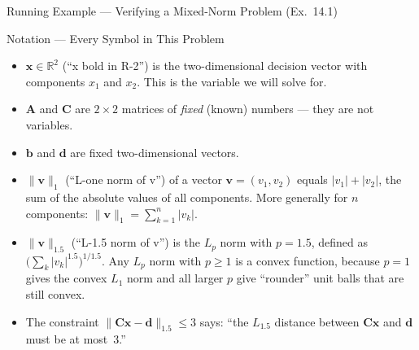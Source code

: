\documentclass[aspectratio=169,10pt]{beamer}
\begin{document}
\begin{frame}[allowframebreaks]{Running Example --- Verifying a Mixed-Norm Problem (Ex.\ 14.1)}
  \begin{block}{Notation --- Every Symbol in This Problem}
    \begin{itemize}
      \item $\mathbf{x} \in \mathbb{R}^2$ (``x bold in R-2'') is the
            two-dimensional decision vector with components $x_1$ and
            $x_2$.  This is the variable we will solve for.
      \item $\mathbf{A}$ and $\mathbf{C}$ are $2 \times 2$ matrices of
            \emph{fixed} (known) numbers --- they are not variables.
      \item $\mathbf{b}$ and $\mathbf{d}$ are fixed two-dimensional
            vectors.
      \item $\|\mathbf{v}\|_1$ (``L-one norm of v'') of a vector
            $\mathbf{v} = (v_1, v_2)$ equals $|v_1| + |v_2|$, the sum
            of the absolute values of all components.  More generally
            for $n$ components: $\|\mathbf{v}\|_1 = \sum_{k=1}^n
            |v_k|$.
      \item $\|\mathbf{v}\|_{1.5}$ (``L-1.5 norm of v'') is the
            $L_p$ norm with $p = 1.5$, defined as
            $\bigl(\sum_k |v_k|^{1.5}\bigr)^{1/1.5}$.  Any $L_p$
            norm with $p \geq 1$ is a convex function, because $p = 1$
            gives the convex $L_1$ norm and all larger $p$ give
            ``rounder'' unit balls that are still convex.
      \item The constraint $\|\mathbf{C}\mathbf{x} -
            \mathbf{d}\|_{1.5} \leq 3$ says: ``the $L_{1.5}$ distance
            between $\mathbf{C}\mathbf{x}$ and $\mathbf{d}$ must be at
            most~3.''
    \end{itemize}
  \end{block}


\end{frame}
\end{document}

